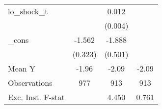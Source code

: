 {\begin{tabular}{l*{3}{c}}
\addlinespace
lo\_shock\_t  &                     &       0.012\sym{***}&                     \\
            &                     &     (0.004)         &                     \\
\addlinespace
\_cons      &      -1.562\sym{***}&      -1.888\sym{***}&                     \\
            &     (0.323)         &     (0.501)         &                     \\
\midrule
Mean Y      &       -1.96         &       -2.09         &       -2.09         \\
Observations&         977         &         913         &         913         \\
Exc. Inst. F-stat&                     &       4.450         &       0.761         \\
\bottomrule
\end{tabular}
}
